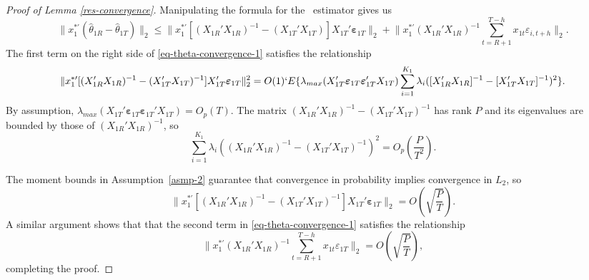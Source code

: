 \documentclass[11pt]{article}
\newcommand{\E}{`E}
\newcommand{\oosSum}[2]{\ensuremath{\sum_{#1=R+#2}^{T-\h}}}
\newcommand{\h}{h}
\newcommand{\bh}[1]{\ensuremath{\hat\theta_{#1}}}
\newcommand{\ep}[1]{\ensuremath{\boldsymbol{\varepsilon}_{#1}}}
\begin{document}
\begin{proof}[Proof of Lemma \ref{res-convergence}]
Manipulating the formula for the \ols\ estimator gives us
\begin{equation} \label{eq-theta-convergence-1}
\lVert x_1^{*\prime} (\bh{1R} - \bh{1T}) \rVert_2 \leq
\lVert x_1^{*\prime} [(X_{1R}'X_{1R})^{-1} - (X_{1T}'X_{1T})]
X_{1T}'\ep{1T} \rVert_2  +
\lVert x_1^{*\prime} (X_{1R}'X_{1R})^{-1}\oosSum{t}{1} x_{1t}\varepsilon_{i,t+\h}
\rVert_2.
\end{equation}
The first term on the right side of \eqref{eq-theta-convergence-1}
satisfies the relationship
\[
\lVert x_{1}^{*\prime}[(X_{1R}'X_{1R})^{-1} -
(X_{1T}'X_{1T})^{-1} ]
X_{1T}'\ep{1T} \rVert_2^2 \\ = O(1)
\E\{\lambda_{max}(X_{1T}' \ep{1T} \ep{1T}'
    X_{1T}) \sum_{i=1}^{K_1}
    \lambda_i([X_{1R}'X_{1R}]^{-1} -
        [X_{1T}'X_{1T}]^{-1} )^2\}.
\]
By assumption, $\lambda_{max}(X_{1T}'\ep{1T} \ep{1T}' X_{1T}) =
O_p(T)$.  The matrix $(X_{1R}'X_{1R})^{-1} - (X_{1T}'X_{1T})^{-1}$ has
rank $P$ and its eigenvalues are bounded by those of
$(X_{1R}'X_{1R})^{-1}$, so
  \[
    \sum_{i=1}^{K_1}
    \lambda_i((X_{1R}'X_{1R})^{-1} -
        (X_{1T}'X_{1T})^{-1} )^2 = O_p(\frac{P}{T^2}).
  \]

The moment bounds in Assumption~\ref{asmp-2} guarantee that
convergence in probability implies convergence in $L_2$, so
  \[
    \lVert x_1^{*\prime} [(X_{1R}'X_{1R})^{-1} -
        (X_{1T}'X_{1T})^{-1} ]
      X_{1T}'\ep{1T} \rVert_2 = O(\sqrt{\frac PT}).
  \]
  A similar argument shows that that the second term in
  \eqref{eq-theta-convergence-1} satisfies the relationship
  \[
    \lVert x_1^{*\prime} (X_{1R}'X_{1R})^{-1}\oosSum{t}{1} x_{1t}\varepsilon_{1T}
    \rVert_2 =   O(\sqrt{\frac PT}),
  \]
  completing the proof.
\end{proof}
\end{document}

